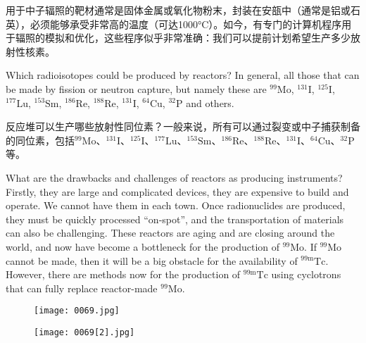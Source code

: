 \documentclass[dvipsnames, svgnames,a4paper,11pt]{article}
\begin{document}
用于中子辐照的靶材通常是固体金属或氧化物粉末，封装在安瓿中（通常是铝或石英），必须能够承受非常高的温度（可达1000°C）。如今，有专门的计算机程序用于辐照的模拟和优化，这些程序似乎非常准确：我们可以提前计划希望生产多少放射性核素。

Which radioisotopes could be produced by reactors? In general, all those that can be made by fission or neutron capture, but namely these are ${}^\text{99}\text{Mo}$, ${}^\text{131}\text{I}$, ${}^\text{125}\text{I}$, ${}^\text{177}\text{Lu}$, ${}^\text{153}\text{Sm}$, ${}^\text{186}\text{Re}$, ${}^\text{188}\text{Re}$, ${}^\text{131}\text{I}$, ${}^\text{64}\text{Cu}$, ${}^\text{32}\text{P}$ and others.

反应堆可以生产哪些放射性同位素？一般来说，所有可以通过裂变或中子捕获制备的同位素，包括${}^\text{99}\text{Mo}$、${}^\text{131}\text{I}$、${}^\text{125}\text{I}$、${}^\text{177}\text{Lu}$、${}^\text{153}\text{Sm}$、${}^\text{186}\text{Re}$、${}^\text{188}\text{Re}$、${}^\text{131}\text{I}$、${}^\text{64}\text{Cu}$、${}^\text{32}\text{P}$等。

What are the drawbacks and challenges of reactors as producing instruments? Firstly, they are large and complicated devices, they are expensive to build and operate. We cannot have them in each town. Once radionuclides are produced, they must be quickly processed “on-spot”, and the transportation of materials can also be challenging. These reactors are aging and are closing around the world, and now have become a bottleneck for the production of ${}^\text{99}\text{Mo}$. If ${}^\text{99}\text{Mo}$ cannot be made, then it will be a big obstacle for the availability of ${}^\text{99m}\text{Tc}$. However, there are methods now for the production of ${}^\text{99m}\text{Tc}$ using cyclotrons that can fully replace reactor-made ${}^\text{99}\text{Mo}$.

\begin{figure}[ht]
    \centering
    \texttt{[image: 0069.jpg]}
     \label{fig59}
    \end{figure}
    
    \begin{figure}[H]
    \centering
    \texttt{[image: 0069[2].jpg]}
     \label{fig60}
    \end{figure}
\end{document}
